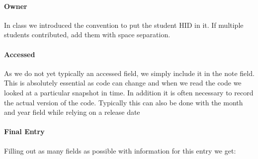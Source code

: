 \paragraph{Owner}
\label{\detokenize{lesson/doc/bibtex:owner}}
In class we introduced the convention to put the student HID in it. If
multiple students contributed, add them with space separation.


\paragraph{Accessed}
\label{\detokenize{lesson/doc/bibtex:accessed}}
As we do not yet typically an accessed field, we simply include it in
the note field. This is absolutely essential as code can change and
when we read the code we looked at a particular snapshot in time. In
addition it is often necessary to record the actual version of the
code. Typically this can also be done with the month and year field
while relying on a release date


\paragraph{Final Entry}
\label{\detokenize{lesson/doc/bibtex:final-entry}}
Filling out as many fields as possible with information for this entry
we get:

\begin{sphinxVerbatim}[commandchars=\\\{\}]
         
            
     
          
         
           
           
         
\end{sphinxVerbatim}

